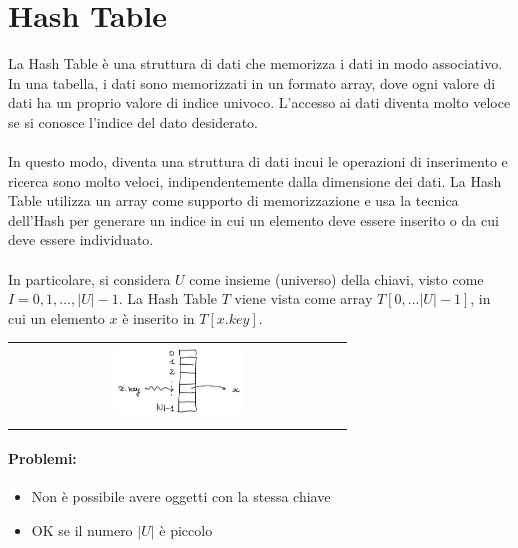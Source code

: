 \section{Hash Table}
La Hash Table è una struttura di dati che memorizza i dati in modo associativo. In una tabella, i dati sono memorizzati in un formato array, dove ogni valore di dati ha un proprio valore di indice univoco. L'accesso ai dati diventa molto veloce se si conosce l'indice del dato desiderato.\\~\\
In questo modo, diventa una struttura di dati incui le operazioni di inserimento e ricerca sono molto veloci, indipendentemente dalla dimensione dei dati. La Hash Table utilizza un array come supporto di memorizzazione e usa la tecnica dell'Hash per generare un indice in cui un elemento deve essere inserito o da cui deve essere individuato. \\~\\
In particolare, si considera $U$ come insieme (universo) della chiavi, visto come $I = 0,1, \ldots,|U|-1$. La Hash Table $T$ viene vista come array $T[0,...|U|-1]$, in cui un elemento $x$ è inserito in $T[x.key]$.

\begin{center}
    \begin{tabular}{c}
        \\ \includegraphics[width=0.4\textwidth]{image/HashTable.png} \\ \\
    \end{tabular}
\end{center}

\paragraph{Problemi:}
\begin{itemize}
    \item Non è possibile avere oggetti con la stessa chiave
    \item OK se il numero $|U|$ è piccolo
\end{itemize}

